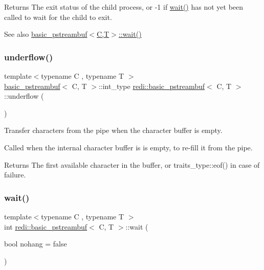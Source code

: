 \begin{DoxyReturn}{Returns}
The exit status of the child process, or -\/1 if \mbox{\hyperlink{classredi_1_1basic__pstreambuf_afa976526cfb7ea56e29afbee8ead68e1}{wait()}} has not yet been called to wait for the child to exit. 
\end{DoxyReturn}
\begin{DoxySeeAlso}{See also}
\mbox{\hyperlink{classredi_1_1basic__pstreambuf_afa976526cfb7ea56e29afbee8ead68e1}{basic\+\_\+pstreambuf$<$\+C,\+T$>$\+::wait()}} 
\end{DoxySeeAlso}
\mbox{\label{classredi_1_1basic__pstreambuf_af7c2677fc95c3f3debf8ec169684703b}} 
\subsubsection{\texorpdfstring{underflow()}{underflow()}}
{\footnotesize\ttfamily template$<$typename C , typename T $>$ \\
\mbox{\hyperlink{classredi_1_1basic__pstreambuf}{basic\+\_\+pstreambuf}}$<$ C, T $>$\+::int\+\_\+type \mbox{\hyperlink{classredi_1_1basic__pstreambuf}{redi\+::basic\+\_\+pstreambuf}}$<$ C, T $>$\+::underflow (\begin{DoxyParamCaption}{ }\end{DoxyParamCaption})\hspace{0.3cm}{\ttfamily [protected]}}



Transfer characters from the pipe when the character buffer is empty. 

Called when the internal character buffer is is empty, to re-\/fill it from the pipe.

\begin{DoxyReturn}{Returns}
The first available character in the buffer, or {\ttfamily traits\+\_\+type\+::eof()} in case of failure. 
\end{DoxyReturn}
\mbox{\label{classredi_1_1basic__pstreambuf_afa976526cfb7ea56e29afbee8ead68e1}} 
\subsubsection{\texorpdfstring{wait()}{wait()}}
{\footnotesize\ttfamily template$<$typename C , typename T $>$ \\
int \mbox{\hyperlink{classredi_1_1basic__pstreambuf}{redi\+::basic\+\_\+pstreambuf}}$<$ C, T $>$\+::wait (\begin{DoxyParamCaption}\item[{bool}]{nohang = {\ttfamily false} }\end{DoxyParamCaption})\hspace{0.3cm}{\ttfamily [protected]}}



